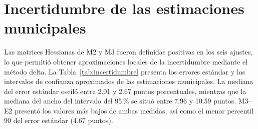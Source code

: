 \begin{table}[!htbp]
\centering
\footnotesize
\caption{Coeficientes estimados de M2 y M3 sobre covariables estandarizadas. Errores estándar aproximados entre paréntesis, obtenidos de la inversa de la matriz Hessiana. M3 utiliza $K=6$ y $\rho=0.50$.}
\label{tab:coeficientes-m2m3}
\renewcommand{\arraystretch}{1.1}
\setlength{\tabcolsep}{3pt}
\end{table}


\section{Incertidumbre de las estimaciones municipales}
\label{sec:res-incertidumbre}

Las matrices Hessianas de M2 y M3 fueron definidas positivas en los seis ajustes, lo que permitió obtener aproximaciones locales de la incertidumbre mediante el método delta. La Tabla~\ref{tab:incertidumbre} presenta los errores estándar y los intervalos de confianza aproximados de las estimaciones municipales. La mediana del error estándar osciló entre 2.01 y 2.67 puntos porcentuales, mientras que la mediana del ancho del intervalo del 95\,\% se situó entre 7.96 y 10.59 puntos. M3--E2 presentó los valores más bajos de ambas medidas, así como el menor percentil 90 del error estándar (4.67 puntos).

